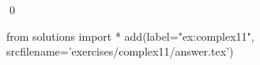 
\begin{ex} 
  \label{ex:complex11}
  
  \qed
\end{ex} 
\begin{python0}
from solutions import *
add(label="ex:complex11",
    srcfilename='exercises/complex11/answer.tex') 
\end{python0}
